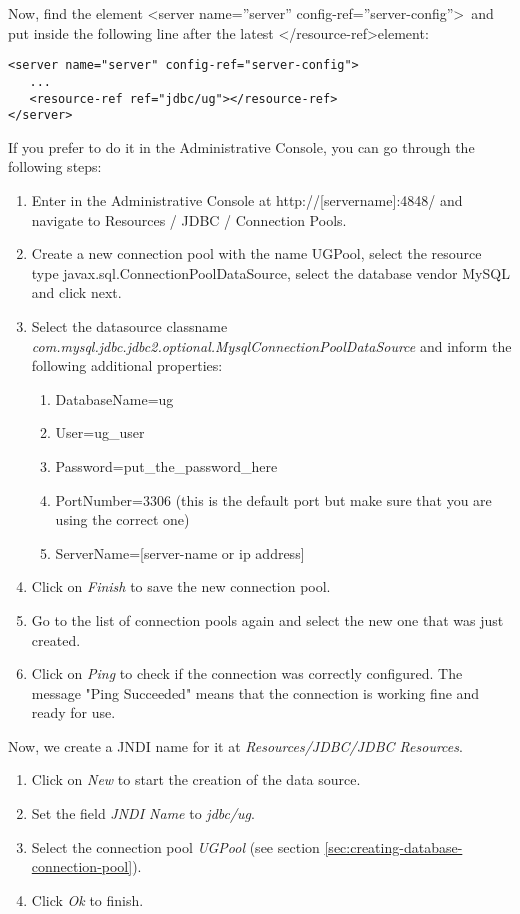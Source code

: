 \documentclass[envcountsame,envcountchap,letterpaper]{svmono}
\begin{document}
Now, find the element \textless server name=''server'' config-ref=''server-config''\textgreater \ and put inside the following line after the latest \textless /resource-ref\textgreater element:

\begin{verbatim}
<server name="server" config-ref="server-config">
   ...
   <resource-ref ref="jdbc/ug"></resource-ref>
</server>
\end{verbatim}

If you prefer to do it in the Administrative Console, you can go through the following steps:

\begin{enumerate}
\item  Enter in the Administrative Console at http://[servername]:4848/ and navigate to Resources / JDBC / Connection Pools.
\item Create a new connection pool with the name UGPool, select the resource type javax.sql.ConnectionPoolDataSource, select the database vendor MySQL and click next.
\item Select the datasource classname \\ \textit{com.mysql.jdbc.jdbc2.optional.MysqlConnectionPoolDataSource} and inform the following additional properties:
   \begin{enumerate}
   \item DatabaseName=ug
   \item User=ug\_user
   \item Password=put\_the\_password\_here
   \item PortNumber=3306 (this is the default port but make sure
   that you are using the correct one)
   \item ServerName=[server-name or ip address]
   \end{enumerate}
\item Click on \textit{Finish} to save the new connection pool.
\item Go to the list of connection pools again and select the new one that was just created.
\item Click on \textit{Ping} to check if the connection was correctly configured. The message "Ping Succeeded" means that the connection is working fine and ready for use.
\end{enumerate}

Now, we create a JNDI name for it at \textit{Resources/JDBC/JDBC Resources}.

\begin{enumerate}
\item Click on \textit{New} to start the creation of the data source.
\item Set the field \textit{JNDI Name} to \textit{jdbc/ug}.
\item Select the connection pool \textit{UGPool} (see section \ref{sec:creating-database-connection-pool}).
\item Click \textit{Ok} to finish.
\end{enumerate}
\end{document}
